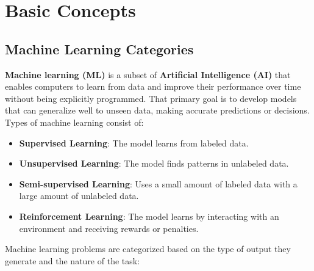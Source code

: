 \section{Basic Concepts}\label{sec:basic-concept}

\subsection{Machine Learning Categories}
\label{subsec:machine-learning-categories}

\textbf{Machine learning (ML)} is a subset of \textbf{Artificial Intelligence (AI)} that enables computers to learn from data and improve their performance over time without being explicitly programmed.
That primary goal is to develop models that can generalize well to unseen data, making accurate predictions or decisions.
Types of machine learning consist of:

\begin{itemize}
    \item { \textbf{Supervised Learning}: The model learns from labeled data. }
    \item { \textbf{Unsupervised Learning}: The model finds patterns in unlabeled data. }
    \item { \textbf{Semi-supervised Learning}: Uses a small amount of labeled data with a large amount of unlabeled data. }
    \item { \textbf{Reinforcement Learning}: The model learns by interacting with an environment and receiving rewards or penalties. }
\end{itemize}

Machine learning problems are categorized based on the type of output they generate and the nature of the task:

